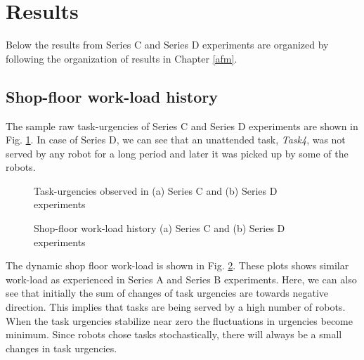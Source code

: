 \section{Results}
\label{sec:results}
Below the results from Series C and Series D experiments are organized by following the organization of results in Chapter \ref{afm}.
\subsection*{Shop-floor work-load history}
The sample raw task-urgencies of Series C and Series D experiments are shown in Fig. \ref{fig:raw-urgencies-SC-SD}. In case of Series D, we can see that an unattended task, \textit{Task4}, was not served by any robot for a long period and later it was picked up by some of the robots. 
\begin{figure}
\centering
\hspace*{0.5cm}
\newline
{}
\caption{\small Task-urgencies observed in (a) Series C and (b) Series D experiments}
\label{fig:raw-urgencies-SC-SD} 
\end{figure}
\begin{figure}
\centering
\hspace*{0.5cm}
\newline
{}
\caption{\small Shop-floor work-load history (a) Series C and (b) Series D experiments}
\label{fig:workload-SC-SD} 
\end{figure}
The dynamic shop floor work-load is shown in Fig. \ref{fig:workload-SC-SD}. These plots shows similar work-load as experienced in Series A and Series B experiments. Here, we can also see that initially the sum of changes of task urgencies are towards negative direction. This implies that tasks are being served by a high number of robots. When the task urgencies stabilize near zero the fluctuations in urgencies become minimum. Since robots chose tasks stochastically, there will always be a small changes in task urgencies.
%
